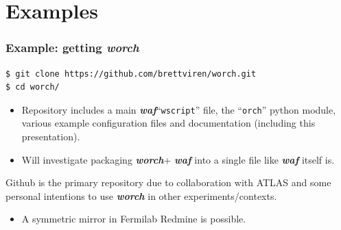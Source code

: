 \documentclass[xcolor=dvipsnames]{beamer}
\newcommand{\app}[1]{\textbf{\textit{#1}}\xspace}
\def\waf{\app{waf}}
\def\worch{\app{worch}}
\begin{document}
\section{Examples}

\begin{frame}
\tableofcontents[
currentsection,currentsubsection,
hideothersubsections,sectionstyle=show/shaded,
] 
\end{frame}

\begin{frame}[fragile]
  \frametitle{Example: getting \worch}

\begin{verbatim}
$ git clone https://github.com/brettviren/worch.git
$ cd worch/
\end{verbatim}

  \begin{itemize}
  \item   Repository includes a main \waf ``\texttt{wscript}'' file, the ``\texttt{orch}'' python module, various example configuration files and documentation (including this presentation).

  \item   Will investigate packaging \worch + \waf into a single file like \waf itself is.

  \end{itemize}

  Github is the primary repository due to collaboration with ATLAS and
  some personal intentions to use \worch in other
  experiments/contexts.
    \begin{itemize}
    \item A symmetric mirror in Fermilab Redmine is possible.
    \end{itemize}


\end{frame}
\end{document}

